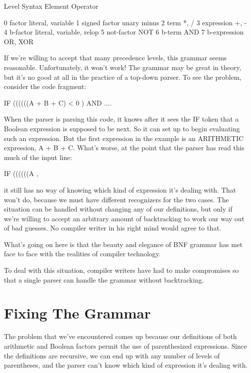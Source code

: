 \documentclass[float=false, crop=false]{standalone}
\begin{document}
          Level   Syntax Element     Operator

          0       factor             literal, variable
          1       signed factor      unary minus
          2       term               *, /
          3       expression         +, -
          4       b-factor           literal, variable, relop
          5       not-factor         NOT
          6       b-term             AND
          7       b-expression       OR, XOR

If we're willing to accept that many precedence levels, this grammar seems
reasonable. Unfortunately, it won't work! The grammar may be great in theory,
but it's no good at all in the practice of a top-down parser. To see the
problem, consider the code fragment:

     IF ((((((A + B + C) < 0 ) AND ....

When the parser is parsing this code, it knows after it sees the IF token that a
Boolean expression is supposed to be next. So it can set up to begin evaluating
such an expression. But the first expression in the example is an ARITHMETIC
expression, A + B + C. What's worse, at the point that the parser has read this
much of the input line:

     IF ((((((A   ,

it still has no way of knowing which kind of expression it's dealing with. That
won't do, because we must have different recognizers for the two cases. The
situation can be handled without changing any of our definitions, but only if
we're willing to accept an arbitrary amount of backtracking to work our way out
of bad guesses. No compiler writer in his right mind would agree to that.

What's going on here is that the beauty and elegance of BNF grammar has met face
to face with the realities of compiler technology.

To deal with this situation, compiler writers have had to make compromises so
that a single parser can handle the grammar without backtracking.

\section{Fixing The Grammar}

The problem that we've encountered comes up because our definitions of both
arithmetic and Boolean factors permit the use of parenthesized expressions.
Since the definitions are recursive, we can end up with any number of levels of
parentheses, and the parser can't know which kind of expression it's dealing
with.
\end{document}
